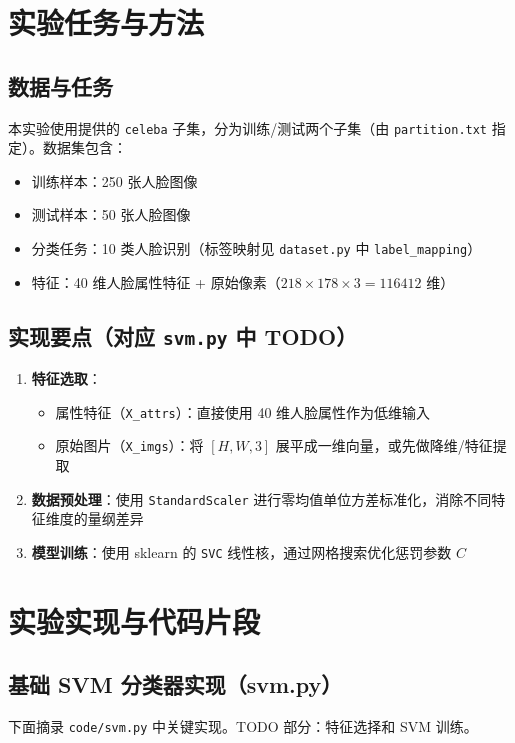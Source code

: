 \documentclass[UTF8]{ctexart}
\begin{document}
\section{实验任务与方法}

\subsection{数据与任务}
本实验使用提供的 \texttt{celeba} 子集，分为训练/测试两个子集（由 \texttt{partition.txt} 指定）。数据集包含：
\begin{itemize}
    \item 训练样本：250 张人脸图像
    \item 测试样本：50 张人脸图像
    \item 分类任务：10 类人脸识别（标签映射见 \texttt{dataset.py} 中 \texttt{label\_mapping}）
    \item 特征：40 维人脸属性特征 + 原始像素（$218 \times 178 \times 3 = 116412$ 维）
\end{itemize}

\subsection{实现要点（对应 \texttt{svm.py} 中 TODO）}
\begin{enumerate}
    \item \textbf{特征选取}：
    \begin{itemize}
        \item 属性特征（\texttt{X\_attrs}）：直接使用 40 维人脸属性作为低维输入
        \item 原始图片（\texttt{X\_imgs}）：将 $[H, W, 3]$ 展平成一维向量，或先做降维/特征提取
    \end{itemize}
    
    \item \textbf{数据预处理}：使用 \texttt{StandardScaler} 进行零均值单位方差标准化，消除不同特征维度的量纲差异
    
    \item \textbf{模型训练}：使用 sklearn 的 \texttt{SVC} 线性核，通过网格搜索优化惩罚参数 $C$
\end{enumerate}

\section{实验实现与代码片段}

\subsection{基础 SVM 分类器实现（svm.py）}
下面摘录 \texttt{code/svm.py} 中关键实现。TODO 部分：特征选择和 SVM 训练。
\end{document}
